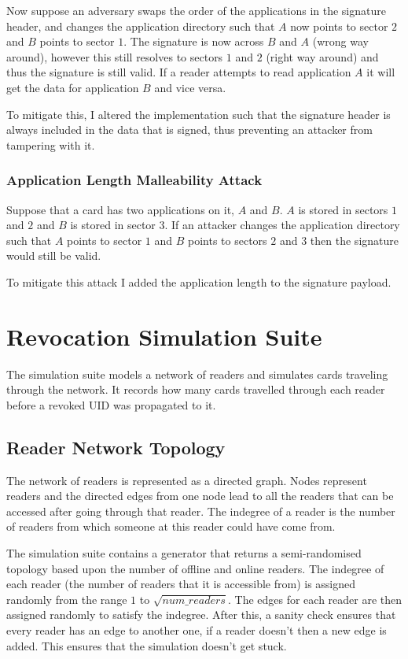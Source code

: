 \documentclass[dissertation.tex]{subfiles}
\begin{document}
  Now suppose an adversary swaps the order of the applications in the signature header, and changes the application directory such that $A$ now points to sector $2$ and $B$ points to sector $1$. The signature is now across $B$ and $A$ (wrong way around), however this still resolves to sectors $1$ and $2$ (right way around) and thus the signature is still valid. If a reader attempts to read application $A$ it will get the data for application $B$ and vice versa.

  To mitigate this, I altered the implementation such that the signature header is always included in the data that is signed, thus preventing an attacker from tampering with it.

  \subsubsection{Application Length Malleability Attack}

  Suppose that a card has two applications on it, $A$ and $B$. $A$ is stored in sectors $1$ and $2$ and $B$ is stored in sector $3$. If an attacker changes the application directory such that $A$ points to sector $1$ and $B$ points to sectors $2$ and $3$ then the signature would still be valid.

  To mitigate this attack I added the application length to the signature payload.

  \section{Revocation Simulation Suite}

  The simulation suite models a network of readers and simulates cards traveling through the network. It records how many cards travelled through each reader before a revoked UID was propagated to it.

  \subsection{Reader Network Topology}\label{sec:topology}
  The network of readers is represented as a directed graph. Nodes represent readers and the directed edges from one node lead to all the readers that can be accessed after going through that reader. The indegree of a reader is the number of readers from which someone at this reader could have come from.

  The simulation suite contains a generator that returns a semi-randomised topology based upon the number of offline and online readers. The indegree of each reader (the number of readers that it is accessible from) is assigned randomly from the range $1$ to $\sqrt{{num\_readers}}$. The edges for each reader are then assigned randomly to satisfy the indegree. After this, a sanity check ensures that every reader has an edge to another one, if a reader doesn't then a new edge is added. This ensures that the simulation doesn't get stuck.
\end{document}
